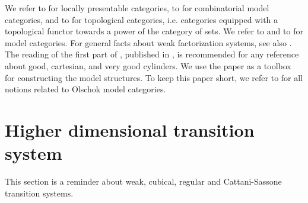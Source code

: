 \documentclass[a4paper,12pt]{amsart}
\begin{document}
We refer to \cite{MR95j:18001} for locally presentable categories, to
\cite{MR2506258} for combinatorial model categories, and to
\cite{topologicalcat} for topological categories, i.e. categories
equipped with a topological functor towards a power of the category of
sets.  We refer to \cite{MR99h:55031} and to \cite{ref_model2} for
model categories. For general facts about weak factorization systems,
see also \cite{ideeloc}. The reading of the first part of
\cite{MOPHD}, published in \cite{MO}, is recommended for any reference
about good, cartesian, and very good cylinders.  We use the paper
\cite{leftdet} as a toolbox for constructing the model structures. To
keep this paper short, we refer to \cite{leftdet} for all notions
related to Olschok model categories. 

\section{Higher dimensional transition system}
\label{reminder}

This section is a reminder about weak, cubical, regular and
Cattani-Sassone transition systems.
\end{document}
